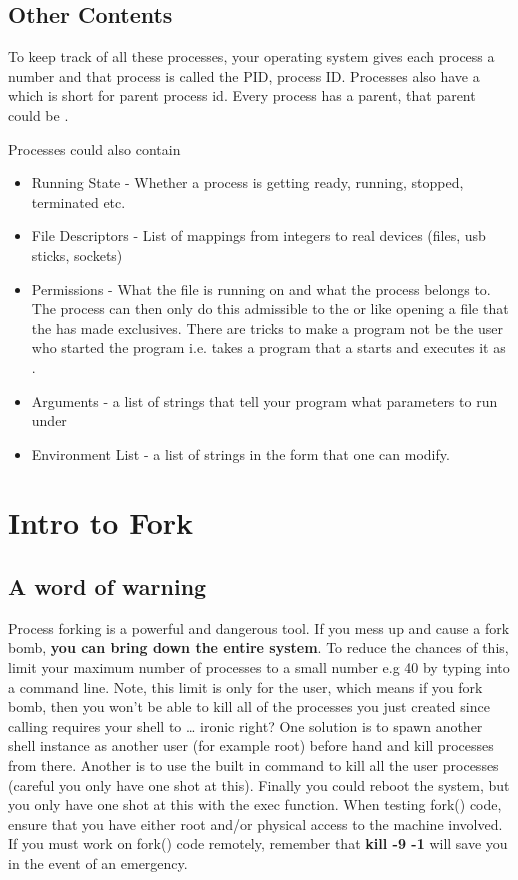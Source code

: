 \subsection{Other Contents}

To keep track of all these processes, your operating system gives each process a number and that process is called the PID, process ID.
Processes also have a  which is short for parent process id.
Every process has a parent, that parent could be .

Processes could also contain 
\begin{itemize}
\item Running State - Whether a process is getting ready, running, stopped, terminated etc. 
\item File Descriptors - List of mappings from integers to real devices (files, usb sticks, sockets) 
\item Permissions - What  the file is running on and what  the process belongs to. The process can then only do this admissible to the  or  like opening a file that the  has made exclusives. There are tricks to make a program not be the user who started the program i.e.  takes a program that a  starts and executes it as . 
\item Arguments - a list of strings that tell your program what parameters to run under
\item Environment List - a list of strings in the form  that one can modify.
\end{itemize}

\section{Intro to Fork}

\subsection{A word of warning}

Process forking is a powerful and dangerous tool.
If you mess up and cause a fork bomb, \textbf{you can bring down the entire system}.
To reduce the chances of this, limit your maximum number of processes to a small number e.g 40 by typing  into a command line.
Note, this limit is only for the user, which means if you fork bomb, then you won't be able to kill all of the processes you just created since calling  requires your shell to  \ldots{} ironic right? One solution is to spawn another shell instance as another user (for example root) before hand and kill processes from there.
Another is to use the built in  command to kill all the user processes (careful you only have one shot at this).
Finally you could reboot the system, but you only have one shot at this with the exec function.
When testing fork() code, ensure that you have either root and/or physical access to the machine involved.
If you must work on fork() code remotely, remember that \textbf{kill -9 -1} will save you in the event of an emergency.

